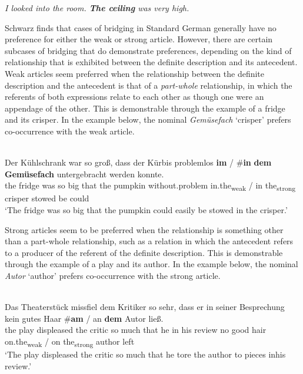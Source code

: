 \documentclass[output=paper,modfonts,nonflat]{langsci/langscibook}
\begin{document}
\ea \label{ex:cisneros:12}
\textit{I looked into the room.  \textbf{The ceiling} was very high.} \citep[171]{Clark1975}
\z 

Schwarz finds that cases of bridging in Standard German generally have no preference for either the weak or strong article.  However, there are certain subcases of bridging that do demonstrate preferences, depending on the kind of relationship that is exhibited between the definite description and its antecedent.  Weak articles seem preferred when the relationship between the definite description and the antecedent is that of a \textit{part-whole} relationship, in which the referents of both expressions relate to each other as though one were an appendage of the other.  This is demonstrable through the example of a fridge and its crisper.  In the example below, the nominal \emph{Gem\"usefach} `crisper' prefers co-occurrence with the weak article.

\ea \label{ex:cisneros:13}
 \\
\gll
Der K\"uhlschrank war so groß, dass der K\"urbis problemlos \textbf{im} \textnormal{/} \textnormal{\#}\textbf{in} \textbf{dem} \textbf{Gem\"usefach} untergebracht werden konnte.\\
the fridge was so big that the pumpkin without.problem in.the\textsubscript{weak} / \phantom{\#}in the\textsubscript{strong} crisper stowed be could\\
\glt
`The fridge was so big that the pumpkin could easily be stowed in the crisper.'
\z

Strong articles seem to be preferred when the relationship is something other than a part-whole relationship, such as a relation in which the antecedent refers to a producer of the referent of the definite description.  This is demonstrable through the example of a play and its author.  In the example below, the nominal \textit{Autor} `author' prefers co-occurrence with the strong article.

\ea \label{ex:cisneros:14}
 \\
\gll
Das Theaterst\"uck missfiel dem Kritiker so sehr, dass er in seiner Besprechung kein gutes Haar \#\textbf{am} \textnormal{/} an \textbf{dem} Autor ließ.\\
the play displeased the critic so much that he in his review no good hair \phantom{\#}on.the\textsubscript{weak} / on the\textsubscript{strong} author left\\
\glt
`The play displeased the critic so much that he tore the author to pieces in\largerpage his review.'
\z 
\end{document}
